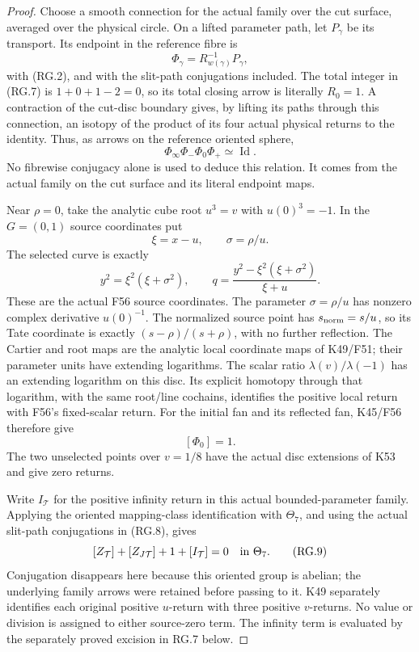 \begin{proof}
Choose a smooth connection for the actual family over the
cut surface, averaged over the physical circle. On a lifted
parameter path, let \(P_\gamma\) be its transport. Its endpoint
in the reference fibre is
\[
             \Phi_\gamma=R_{w(\gamma)}^{-1}P_\gamma,
\]
with (RG.2), and with the slit-path conjugations included.
The total integer in (RG.7) is \(1+0+1-2=0\), so its total
closing arrow is literally \(R_0=1\). A contraction of the
cut-disc boundary gives, by lifting its paths through this
connection, an isotopy of the product of its four actual
physical returns to the identity. Thus, as arrows on the
reference oriented sphere,
\[
       \Phi_\infty\Phi_-\Phi_0\Phi_+\simeq\operatorname{Id}.
                                                               \tag{RG.8}
\]
No fibrewise conjugacy alone is used to deduce this relation.
It comes from the actual family on the cut surface and its
literal endpoint maps.

Near \(\rho=0\), take the analytic cube root \(u^3=v\) with
\(u(0)^3=-1\). In the \(G=(0,1)\) source coordinates put
\[
 \xi=x-u,\qquad \sigma=\rho/u.
\]
The selected curve is exactly
\[
 y^2=\xi^2(\xi+\sigma^2),\qquad
 q=\frac{y^2-\xi^2(\xi+\sigma^2)}{\xi+u}.
\]
These are the actual F56 source coordinates. The parameter
\(\sigma=\rho/u\) has nonzero complex derivative \(u(0)^{-1}\).
The normalized source point has
\(s_{\rm norm}=s/u\), so its Tate coordinate is exactly
\((s-\rho)/(s+\rho)\), with no further reflection. The
Cartier and root maps are the analytic local coordinate maps
of K49/F51; their parameter units have extending logarithms.
The scalar ratio
\(\lambda(v)/\lambda(-1)\) has an extending logarithm on this
disc. Its explicit homotopy through that logarithm, with the
same root/line cochains, identifies the positive local return
with F56's fixed-scalar return. For the initial fan and its
reflected fan, K45/F56 therefore give
\[
                         [\Phi_0]=1.
\]
The two unselected points over \(v=1/8\) have the actual
disc extensions of K53 and give zero returns.

Write \(I_{\mathcal T}\) for the positive infinity return in
this actual bounded-parameter family. Applying the oriented
mapping-class identification with \(\Theta_7\), and using the
actual slit-path conjugations in (RG.8), gives
\[
 [Z_{\mathcal T}]+[Z_{J\mathcal T}]+1+[I_{\mathcal T}]
                  =0\quad\hbox{in }\Theta_7.          \tag{RG.9}
\]
Conjugation disappears here because this oriented group is
abelian; the underlying family arrows were retained before
passing to it. K49 separately identifies each original
positive \(u\)-return with three positive \(v\)-returns.
No value or division is assigned to either source-zero term.
The infinity term is evaluated by the separately proved excision
in RG.7 below.


\end{proof}
